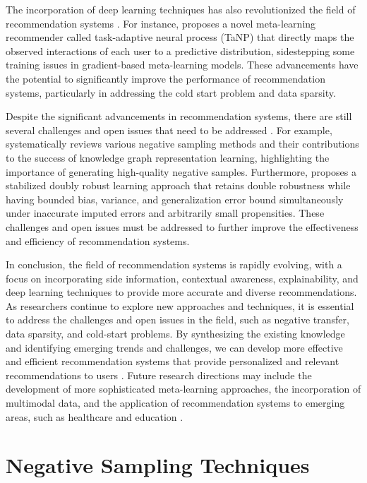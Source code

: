 \documentclass[11pt,a4paper]{article}
\begin{document}
The incorporation of deep learning techniques has also revolutionized the field of recommendation systems \cite{arxiv:2206.04415}. For instance, \cite{doi:10.1145/3442381.3449908} proposes a novel meta-learning recommender called task-adaptive neural process (TaNP) that directly maps the observed interactions of each user to a predictive distribution, sidestepping some training issues in gradient-based meta-learning models. These advancements have the potential to significantly improve the performance of recommendation systems, particularly in addressing the cold start problem and data sparsity.

Despite the significant advancements in recommendation systems, there are still several challenges and open issues that need to be addressed \cite{doi:10.1109/jas.2022.106004}. For example, \cite{arxiv:2402.19195} systematically reviews various negative sampling methods and their contributions to the success of knowledge graph representation learning, highlighting the importance of generating high-quality negative samples. Furthermore, \cite{arxiv:2205.04701} proposes a stabilized doubly robust learning approach that retains double robustness while having bounded bias, variance, and generalization error bound simultaneously under inaccurate imputed errors and arbitrarily small propensities. These challenges and open issues must be addressed to further improve the effectiveness and efficiency of recommendation systems.

In conclusion, the field of recommendation systems is rapidly evolving, with a focus on incorporating side information, contextual awareness, explainability, and deep learning techniques to provide more accurate and diverse recommendations. As researchers continue to explore new approaches and techniques, it is essential to address the challenges and open issues in the field, such as negative transfer, data sparsity, and cold-start problems. By synthesizing the existing knowledge and identifying emerging trends and challenges, we can develop more effective and efficient recommendation systems that provide personalized and relevant recommendations to users \cite{doi:10.1145/3583780.3614965}. Future research directions may include the development of more sophisticated meta-learning approaches, the incorporation of multimodal data, and the application of recommendation systems to emerging areas, such as healthcare and education \cite{doi:10.1145/3511808.3557335}.


\section{Negative Sampling Techniques}
\end{document}

